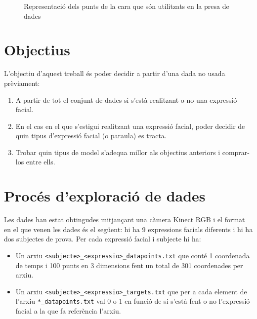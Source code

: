 \documentclass[a4paper]{article}
\begin{document}
\begin{figure}[H]
	\centering
	\caption{Representació dels punts de la cara que són utilitzats en la presa de dades}
\end{figure}

\section{Objectius}

L'objectiu d'aquest treball és poder decidir a partir d'una dada no usada prèviament:
\begin{enumerate}
	\item A partir de tot el conjunt de dades si s'està realitzant o no una expressió facial.
	\item En el cas en el que s'estigui realitzant una expressió facial, poder decidir de quin tipus d'expressió facial (o paraula) es tracta.
	\item Trobar quin tipus de model s'adequa millor als objectius anteriors i comprar-los entre ells.
\end{enumerate}

\newpage
\section{Procés d'exploració de dades}

Les dades han estat obtingudes mitjançant una càmera Kinect RGB\cite{freitas} i el format en el que venen les dades és el següent: hi ha 9 expressions facials diferents i hi ha dos subjectes de prova. Per cada expressió facial i subjecte hi ha:
\begin{itemize}
	\item Un arxiu \verb|<subjecte>_<expressio>_datapoints.txt| que conté 1 coordenada de temps i 100 punts en 3 dimensions fent un total de 301 coordenades per arxiu.
	\item Un arxiu \verb|<subjecte>_<expressio>_targets.txt| que per a cada element de l'arxiu \verb|*_datapoints.txt| val 0 o 1 en funció de si s'està fent o no l'expressió facial a la que fa referència l'arxiu.
\end{itemize}
\end{document}
